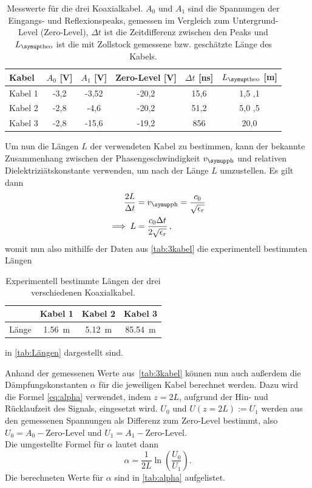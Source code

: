 \begin{table}[h]
\centering
\begin{tabular}{lccccc}
    \toprule
    Kabel & $A_0$ [V] & $A_1$ [V] & Zero-Level [V] & $\Delta t$ [ns] & $L_\T{theo}$ [m] \\
    \midrule
    Kabel 1 & -3,2 & -3,52 & -20,2 & 15,6 & 1,5 \pm 0,1 \\
    Kabel 2 & -2,8 & -4,6  & -20,2 & 51,2 & 5,0 \pm 0,5 \\
    Kabel 3 & -2,8 & -15,6 & -19,2 & 856  & 20,0 \\
    \bottomrule
\end{tabular}
\caption{Messwerte für die drei Koaxialkabel. $A_0$ und $A_1$ sind die Spannungen der Eingangs- und Reflexionspeaks, gemessen im Vergleich zum Untergrund-Level (Zero-Level), $\Delta t$ ist die Zeitdifferenz zwischen den Peaks und $L_\T{theo}$ ist die mit Zollstock gemessene bzw. geschätzte Länge des Kabels.}
\label{tab:3kabel}
\end{table}

Um nun die Längen $L$ der verwendeten Kabel zu bestimmen, kann der bekannte Zusammenhang zwischen der Phasengeschwindigkeit $v_\T{ph}$ und relativen Dielektriziätskonstante verwenden, um nach der Länge $L$ umzustellen. Es gilt dann 
\begin{align}
    \frac{2L}{\Delta t} &= v_\T{ph} = \frac{c_0}{\sqrt{\epsilon_r}} \\
    \implies L &= \frac{c_0 \Delta t}{2 \sqrt{\epsilon_r}} \, ,
    \label{eq:L}
\end{align}
womit nun also mithilfe der Daten aus \autoref{tab:3kabel} die experimentell bestimmten Längen 
\begin{table}[htbp]
    \centering
    \begin{tabular}{lccc}
    \toprule
    & Kabel 1 & Kabel 2 & Kabel 3 \\
    \midrule
    Länge & \qty{1.56}{\meter} & \qty{5.12}{\meter} & \qty{85.54}{\meter} \\
    \bottomrule
\end{tabular}
\caption{Experimentell bestimmte Längen der drei verschiedenen Koaxialkabel.}
\label{tab:Längen}
\end{table}
in \autoref{tab:Längen} dargestellt sind. 

\vspace{2cm}

Anhand der gemessenen Werte aus~\autoref{tab:3kabel} können nun auch außerdem die Dämpfungskonstanten $\alpha$ für die jeweiligen Kabel berechnet werden. Dazu wird die Formel \eqref{eq:alpha} verwendet, indem $z=2L$, aufgrund der Hin- nud Rücklaufzeit des Signals, eingesetzt wird. 
$U_0$ und $U(z=2L) := U_1$ werden aus den gemessenen Spannungen als Differenz zum Zero-Level bestimmt, also $U_0 = A_0 - \text{Zero-Level}$ und $U_1 = A_1 - \text{Zero-Level}$. \\
Die umgestellte Formel für $\alpha$ lautet dann 
\begin{equation}
    \alpha = \frac{1}{2L} \ln\left(\frac{U_0}{U_1}\right) .
\end{equation}
Die berechneten Werte für $\alpha$ sind in \autoref{tab:alpha} aufgelistet.


